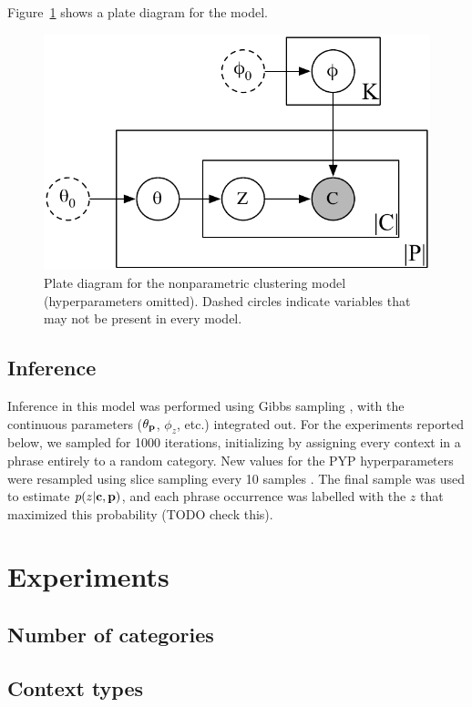 \noindent Figure~\ref{fig:np_plate} shows a plate diagram for the model.

\begin{figure}
\begin{center}
\includegraphics[scale=0.75]{pyp_clustering/np_plate.pdf}
\vspace{-0.3cm}
\end{center}
\caption{Plate diagram for the nonparametric clustering model (hyperparameters omitted).  Dashed circles indicate variables that may not be present in every model.}
\label{fig:np_plate}
\end{figure}

\subsection{Inference}

Inference in this model was performed using Gibbs sampling \citep{geman:1984}, with the continuous parameters ($\theta_{\textbf{p}}$, $\phi_z$, etc.) integrated out.  For the experiments reported below, we sampled for 1000 iterations, initializing by assigning every context in a phrase entirely to a random category.  New values for the PYP hyperparameters were resampled using slice sampling every 10 samples \citep{neal:2000,johnson:2009}. The final sample was used to estimate $p(z|\textbf{c},\textbf{p})$, and each phrase occurrence was labelled with the $z$ that maximized this probability (TODO check this).

\section{Experiments}

\subsection{Number of categories}

\subsection{Context types}


